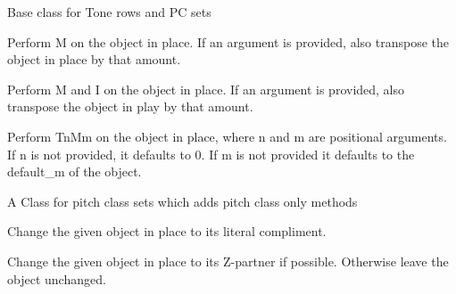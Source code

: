 \documentclass[letterpaper,10pt,english]{sphinxmanual}
\begin{document}
\begin{fulllineitems}
\label{_templates/core:core.PCBase}
Base class for Tone rows and PC sets

\begin{fulllineitems}
\label{_templates/core:core.PCBase.m}
Perform M on the object in place. If an argument is provided, also
transpose the object in place by that amount.

\end{fulllineitems}


\begin{fulllineitems}
\label{_templates/core:core.PCBase.mi}
Perform M and I on the object in place. If an argument is provided,
also transpose the object in play by that amount.

\end{fulllineitems}


\begin{fulllineitems}
\label{_templates/core:core.PCBase.t_m}
Perform TnMm on the object in place, where n and m are positional
arguments. If n is not provided, it defaults to 0. If m is not provided
it defaults to the default\_m of the object.

\end{fulllineitems}


\end{fulllineitems}


\begin{fulllineitems}
\label{_templates/core:core.PCSet}
A Class for pitch class sets which adds pitch class only methods

\begin{fulllineitems}
\label{_templates/core:core.PCSet.c}
Change the given object in place to its literal compliment.

\end{fulllineitems}


\begin{fulllineitems}
\label{_templates/core:core.PCSet.z}
Change the given object in place to its Z-partner if possible.
Otherwise leave the object unchanged.

\end{fulllineitems}


\end{fulllineitems}
\end{document}
